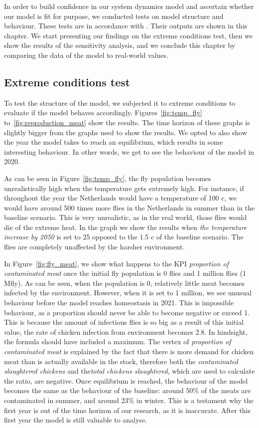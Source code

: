 In order to build confidence in our system dynamics model and ascertain whether our model is fit for purpose, we conducted tests on model structure and behaviour. These tests are in accordance with \cite{forrester_tests_1980}. Their outputs are shown in this chapter. We start presenting our findings on the extreme conditions test, then we show the results of the sensitivity analysis, and we conclude this chapter by comparing the data of the model to real-world values.

\subsection{Extreme conditions test}
\label{s:extreme_conditions}

To test the structure of the model, we subjected it to extreme conditions to evaluate if the model behaves accordingly. Figures~\ref{fig:temp_fly} to~\ref{fig:reproduction_meat} show the results. The time horizon of these graphs is slightly bigger from the graphs used to show the results. We opted to also show the year the model takes to reach an equilibrium, which results in some interesting behaviour. In other words, we get to see the behaviour of the model in 2020.

As can be seen in Figure~\ref{fig:temp_fly}, the fly population becomes unrealistically high when the temperature gets extremely high. For instance, if throughout the year the Netherlands would have a temperature of 100 \degree c, we would have around 500 times more flies in the Netherlands in summer than in the baseline scenario. This is very unrealistic, as in the real world, those flies would die of the extreme heat. In the graph we show the results when \textit{the temperature increase by 2050} is set to 25 opposed to the 1.5 \degree c of the baseline scenario. The flies are completely unaffected by the harsher environment.

In Figure~\ref{fig:fly_meat}, we show what happens to the KPI \textit{proportion of contaminated meat} once the initial fly population is 0 flies and 1 million flies (1 Mfly). As can be seen, when the population is 0, relatively little meat becomes infected by the environment. However, when it is set to 1 million, we see unusual behaviour before the model reaches homeostasis in 2021. This is impossible behaviour, as a proportion should never be able to become negative or exceed 1. This is because the amount of infectious flies is so big as a result of this initial value, the rate of chicken infection from environment becomes 2.8. In hindsight, the formula should have included a maximum. The vertex of \textit{proportion of contaminated meat} is explained by the fact that there is more demand for chicken meat than is actually available in the stock, therefore both the \textit{contaminated slaughtered chickens} and the\textit{total chickens slaughtered}, which are used to calculate the ratio, are negative. Once equilibrium is reached, the behaviour of the model becomes the same as the behaviour of the baseline: around 50\% of the meats are contaminated in summer, and around 23\% in winter. This is a testament why the first year is out of the time horizon of our research, as it is inaccurate. After this first year the model is still valuable to analyse.


